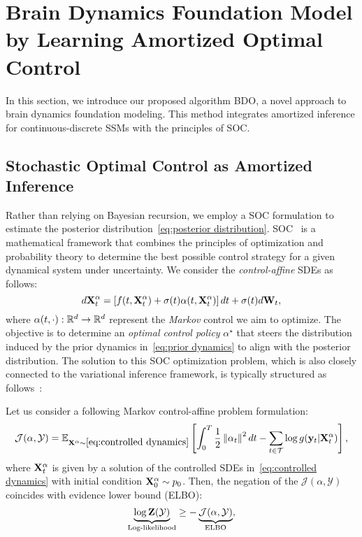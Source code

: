 \section{Brain Dynamics Foundation Model by Learning Amortized Optimal Control}
\label{sec:main:method}
In this section, we introduce our proposed algorithm BDO, a novel approach to brain dynamics foundation modeling. This method integrates amortized inference for continuous-discrete SSMs with the principles of SOC.


\subsection{Stochastic Optimal Control as Amortized Inference}
\label{sec:main:method:subsection:SOC}
Rather than relying on Bayesian recursion, we employ a SOC formulation to estimate the posterior distribution~\eqref{eq:posterior distribution}. SOC~\citep{fleming2006controlled, carmona2016lectures} is a mathematical framework that combines the principles of optimization and probability theory to determine the best possible control strategy for a given dynamical system under uncertainty. We consider the \textit{control-affine} SDEs as follows:
\[\label{eq:controlled dynamics}
 d\mathbf{X}^{\alpha}_t = \left[f(t, \mathbf{X}^{\alpha}_t) + \sigma(t)\alpha(t, \mathbf{X}^{\alpha}_t)\right]dt + \sigma(t) d\mathbf{W}_t,
\]
where $\alpha(t, \cdot): \mathbb{R}^d \to \mathbb{R}^d$ represent the \textit{Markov} control we aim to optimize. The objective is to determine an \textit{optimal control policy} $\alpha^{\star}$ that steers the distribution induced by the prior dynamics in~\eqref{eq:prior dynamics} to align with the posterior distribution. The solution to this SOC optimization problem, which is also closely connected to the variational inference framework, is typically structured as follows~\citep{theodorou2015nonlinear, kappen2016adaptive, li2020scalable, park2024amortized}:
\begin{proposition}\label{proposition:ELBO} Let us consider a following Markov control-affine problem formulation:
\[\label{eq:cost-to-go function}
    \mathcal{J}(\alpha,\mathcal{Y}) = \mathbb{E}_{\mathbf{X}^{\alpha} \sim \eqref{eq:controlled dynamics}} \left[ \int_0^T \frac{1}{2} \left\lVert{\alpha_t}\right\rVert^2 dt  - \sum_{t \in \mathcal{T}} \log g(\mathbf{y}_{t} | \mathbf{X}^{\alpha}_{t})\right], 
\]
where $\mathbf{X}^{\alpha}_t$ is given by a solution of the controlled SDEs in~\eqref{eq:controlled dynamics} with initial condition $\mathbf{X}^{\alpha}_0 \sim p_0$. Then, the negation of the $\mathcal{J}(\alpha, \mathcal{Y})$ coincides with evidence lower bound (ELBO):
\[\label{eq:ELBO}
    \underbrace{\log \mathbf{Z}(\mathcal{Y})}_{\text{Log-likelihood}} \geq -\underbrace{\mathcal{J}(\alpha, \mathcal{Y})}_{\text{ELBO}},
\]
\end{proposition}

